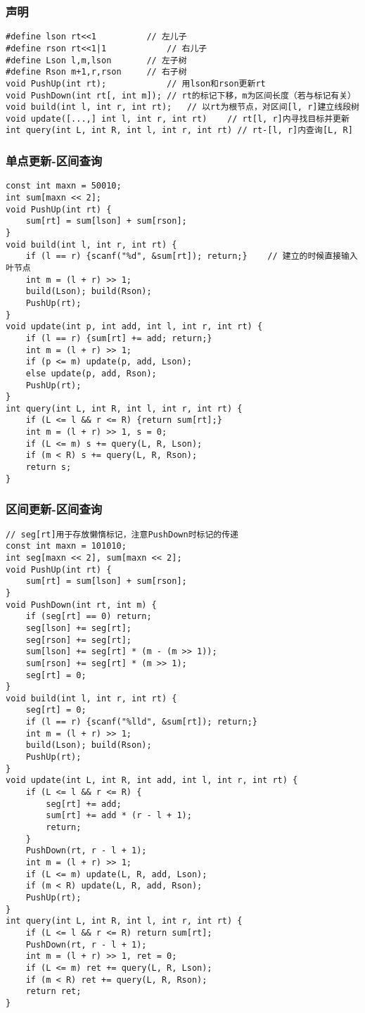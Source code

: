 \documentclass[a4paper]{article}
\begin{document}
\subsubsection{声明}
\begin{lstlisting}
#define lson rt<<1			// 左儿子
#define rson rt<<1|1			// 右儿子
#define Lson l,m,lson		// 左子树
#define Rson m+1,r,rson 	// 右子树
void PushUp(int rt);			// 用lson和rson更新rt
void PushDown(int rt[, int m]);	// rt的标记下移，m为区间长度（若与标记有关）
void build(int l, int r, int rt);	// 以rt为根节点，对区间[l, r]建立线段树
void update([...,] int l, int r, int rt)	// rt[l, r]内寻找目标并更新
int query(int L, int R, int l, int r, int rt) // rt-[l, r]内查询[L, R] 
\end{lstlisting}
\subsubsection{单点更新-区间查询}
\begin{lstlisting}
const int maxn = 50010;
int sum[maxn << 2];
void PushUp(int rt) {
	sum[rt] = sum[lson] + sum[rson];
}
void build(int l, int r, int rt) {
	if (l == r) {scanf("%d", &sum[rt]); return;}	// 建立的时候直接输入叶节点
	int m = (l + r) >> 1;
	build(Lson); build(Rson);
	PushUp(rt);
}
void update(int p, int add, int l, int r, int rt) {
	if (l == r) {sum[rt] += add; return;}
	int m = (l + r) >> 1;
	if (p <= m) update(p, add, Lson);
	else update(p, add, Rson);
	PushUp(rt);
}
int query(int L, int R, int l, int r, int rt) {
	if (L <= l && r <= R) {return sum[rt];}
	int m = (l + r) >> 1, s = 0;
	if (L <= m) s += query(L, R, Lson);
	if (m < R) s += query(L, R, Rson);
	return s;
}
\end{lstlisting}
\subsubsection{区间更新-区间查询}
\begin{lstlisting}
// seg[rt]用于存放懒惰标记，注意PushDown时标记的传递
const int maxn = 101010;
int seg[maxn << 2], sum[maxn << 2];
void PushUp(int rt) {
	sum[rt] = sum[lson] + sum[rson];
}
void PushDown(int rt, int m) {
	if (seg[rt] == 0) return;
	seg[lson] += seg[rt];
	seg[rson] += seg[rt];
	sum[lson] += seg[rt] * (m - (m >> 1));
	sum[rson] += seg[rt] * (m >> 1);
	seg[rt] = 0;
}
void build(int l, int r, int rt) {
	seg[rt] = 0;
	if (l == r) {scanf("%lld", &sum[rt]); return;}
	int m = (l + r) >> 1;
	build(Lson); build(Rson);
	PushUp(rt);
}
void update(int L, int R, int add, int l, int r, int rt) {
	if (L <= l && r <= R) {
		seg[rt] += add;
		sum[rt] += add * (r - l + 1);
		return;
	}
	PushDown(rt, r - l + 1);
	int m = (l + r) >> 1;
	if (L <= m) update(L, R, add, Lson);
	if (m < R) update(L, R, add, Rson);
	PushUp(rt);
}
int query(int L, int R, int l, int r, int rt) {
	if (L <= l && r <= R) return sum[rt];
	PushDown(rt, r - l + 1);
	int m = (l + r) >> 1, ret = 0;
	if (L <= m) ret += query(L, R, Lson);
	if (m < R) ret += query(L, R, Rson);
	return ret;
}
\end{lstlisting}
\clearpage
\end{document}
